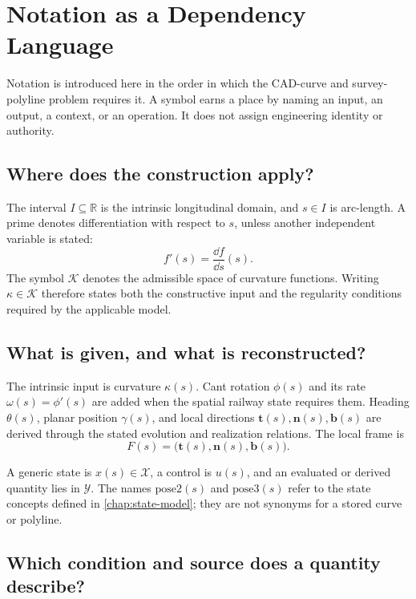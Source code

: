 
\chapter{Notation as a Dependency Language}
\label{chap:notation}

Notation is introduced here in the order in which the CAD-curve and
survey-polyline problem requires it. A symbol earns a place by naming an
input, an output, a context, or an operation. It does not assign
engineering identity or authority.

\section{Where does the construction apply?}

The interval \(I\subseteq\mathbb{R}\) is the intrinsic longitudinal
domain, and \(s\in I\) is arc-length. A prime denotes differentiation
with respect to \(s\), unless another independent variable is stated:
\[
f'(s)=\frac{\dd f}{\dd s}(s).
\]
The symbol \(\mathcal K\) denotes the admissible space of curvature
functions. Writing \(\kappa\in\mathcal K\) therefore states both the
constructive input and the regularity conditions required by the
applicable model.

\section{What is given, and what is reconstructed?}

The intrinsic input is curvature \(\kappa(s)\). Cant rotation
\(\phi(s)\) and its rate \(\omega(s)=\phi'(s)\) are added when the
spatial railway state requires them. Heading \(\theta(s)\), planar
position \(\gamma(s)\), and local directions
\(\mathbf t(s),\mathbf n(s),\mathbf b(s)\) are derived through the
stated evolution and realization relations. The local frame is
\[
F(s)=\bigl(\mathbf t(s),\mathbf n(s),\mathbf b(s)\bigr).
\]

A generic state is \(x(s)\in\mathcal X\), a control is \(u(s)\), and
an evaluated or derived quantity lies in \(\mathcal Y\). The names
\(\mathrm{pose2}(s)\) and \(\mathrm{pose3}(s)\) refer to the state
concepts defined in \cref{chap:state-model}; they are not synonyms for a
stored curve or polyline.

\section{Which condition and source does a quantity describe?}

